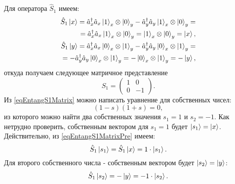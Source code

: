 Для оператора $\hat{S}_1$ имеем:
\begin{eqnarray}
\hat{S}_1 \ket{x} = \hat{a}_x^{\dag} \hat{a}_x
\ket{1}_x\otimes\ket{0}_y - \hat{a}_y^{\dag}
\hat{a}_y\ket{1}_x\otimes\ket{0}_y =
\nonumber \\
= 
\hat{a}_x^{\dag} \hat{a}_x
\ket{1}_x\otimes\ket{0}_y =
\ket{1}_x\otimes\ket{0}_y = \ket{x},
\nonumber \\
\hat{S}_1 \ket{y} = \hat{a}_x^{\dag} \hat{a}_x
\ket{0}_x\otimes\ket{1}_y - \hat{a}_y^{\dag}
\hat{a}_y\ket{0}_x\otimes\ket{1}_y =
\nonumber \\
=
-\hat{a}_y^{\dag}
\hat{a}_y\ket{0}_x\otimes\ket{1}_y
=-\ket{0}_x\otimes\ket{1}_y = -\ket{y},
\label{eqEntangS1MatrixPre}
\end{eqnarray}
откуда получаем следующее матричное представление
\begin{equation}
\hat{S}_1 = 
\left(
\begin{array}{cc}
1 & 0 \\
0 & -1 
\end{array}
\right).
\label{eqEntangS1Matrix}
\end{equation}
Из \eqref{eqEntangS1Matrix} можно написать уравнение для собственных
чисел:
\[
\left(1-s\right)\left(1 + s\right) = 0,
\]
из которого можно найти два собственных значения $s_1 = 1$ и
$s_2 = -1$. Как нетрудно проверить, собственным вектором для $s_1 = 1$
будет $\ket{s_1} = \ket{x}$. Действительно, из \eqref{eqEntangS1MatrixPre}
имеем:
\begin{equation}
\hat{S}_1 \ket{s_1} = \hat{S}_1 \ket{x} = 1 \cdot \ket{s_1}.
\label{eq:part2:pol:stocks_s1_1}
\end{equation}
Для второго собственного числа - собственным вектором будет
$\ket{s_2} = \ket{y}$:
\begin{equation}
\hat{S}_1 \ket{s_2}  = - \ket{y} = -1 \cdot \ket{s_2}.
\label{eq:part2:pol:stocks_s1_2}
\end{equation}


